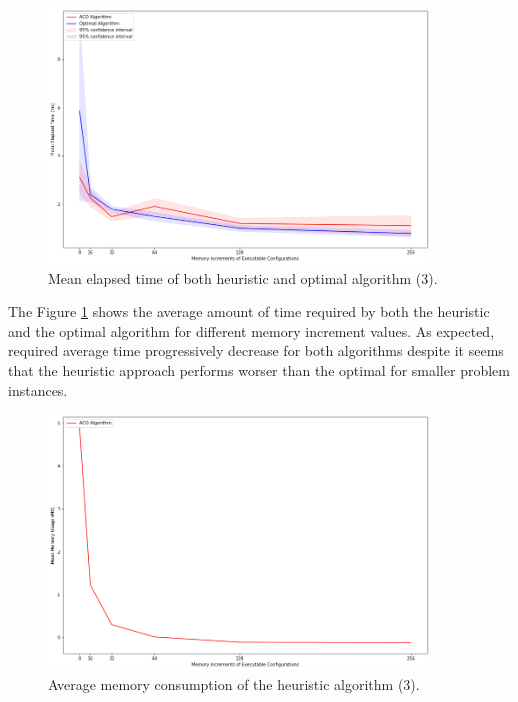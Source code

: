 \documentclass[12pt,a4paper]{report}
\begin{document}
\begin{figure}[h]
	\centering
	\includegraphics[width=0.9\textwidth]{./experiments/ACOvsOptimalIncreasingMemoryIncrement.png}
	\caption{Mean elapsed time of both heuristic and optimal algorithm (3).}%
	\label{ACOvsOptimalIncreasingMemoryIncrement}
\end{figure}

The Figure \ref{ACOvsOptimalIncreasingMemoryIncrement} shows the average amount of time required by both the heuristic and the optimal algorithm for different memory increment values. As expected, required average time progressively decrease for both algorithms despite it seems that the heuristic approach performs worser than the optimal for smaller problem instances.

\begin{figure}[h]
	\centering
	\includegraphics[width=0.9\textwidth]{./experiments/ACORamConsumptionIncreasingMemoryIncrement.png}
	\caption{Average memory consumption of the heuristic algorithm (3).}%
	\label{ACORamConsumptionIncreasingMemoryIncrement}
\end{figure}
\end{document}
